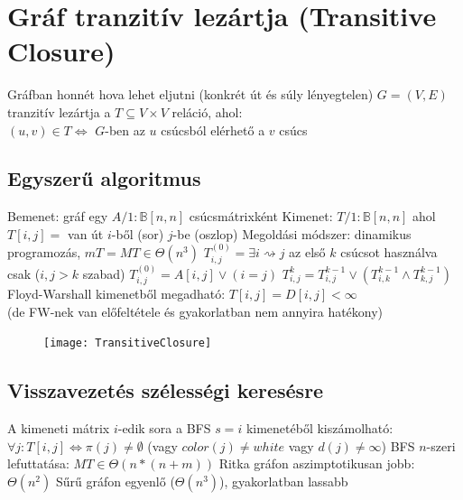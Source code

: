 \documentclass[12pt,a4paper]{article}
\renewcommand{\leadsto}{\rightsquigarrow}
\begin{document}
\pagebreak

\section{Gráf tranzitív lezártja (Transitive Closure)}

\begin{outline}
	\1 Gráfban honnét hova lehet eljutni (konkrét út és súly lényegtelen)
	\1 $G=(V,E)$ tranzitív lezártja a $T \subseteq V \times V$ reláció, ahol:\\
	$(u,v) \in T \Leftrightarrow$ $G$-ben az $u$ csúcsból elérhető a $v$ csúcs
\end{outline}

\subsection{Egyszerű algoritmus}

\begin{outline}
	\1 Bemenet: gráf egy $A/1:\mathbb{B}[n,n]$ csúcsmátrixként
	\1 Kimenet: $T/1:\mathbb{B}[n,n]$ ahol $T[i,j]=$ van út $i$-ből (sor) $j$-be (oszlop)
	\1 Megoldási módszer: dinamikus programozás, $mT=MT \in \Theta(n^3)$
		\2 $T^{(0)}_{i,j}=\exists i \leadsto j$ az első $k$ csúcsot használva csak ($i,j>k$ szabad)
		\2 $T^{(0)}_{i,j}=A[i,j] \lor (i=j)$
		\2 $T^{k}_{i,j}=T^{k-1}_{i,j} \lor (T^{k-1}_{i,k} \wedge T^{k-1}_{k,j})$
	\1 Floyd-Warshall kimenetből megadható: $T[i,j] = D[i,j] < \infty$\\
	(de FW-nek van előfeltétele és gyakorlatban nem annyira hatékony)
\end{outline}

\begin{figure}[h!]
	\centering
	\texttt{[image: TransitiveClosure]}
\end{figure}

\subsection{Visszavezetés szélességi keresésre}

\begin{outline}
	\1 A kimeneti mátrix $i$-edik sora a BFS $s=i$ kimenetéből kiszámolható:\\
	$\forall j: T[i,j] \Leftrightarrow \pi(j) \ne \emptyset$ \;\;
	(vagy $color(j) \ne white$ vagy $d(j) \ne \infty$)
	\1 BFS $n$-szeri lefuttatása: $MT \in \Theta(n*(n+m))$
		\2 Ritka gráfon aszimptotikusan jobb: $\Theta(n^2)$
		\2 Sűrű gráfon egyenlő ($\Theta(n^3)$), gyakorlatban lassabb
\end{outline}
\end{document}
